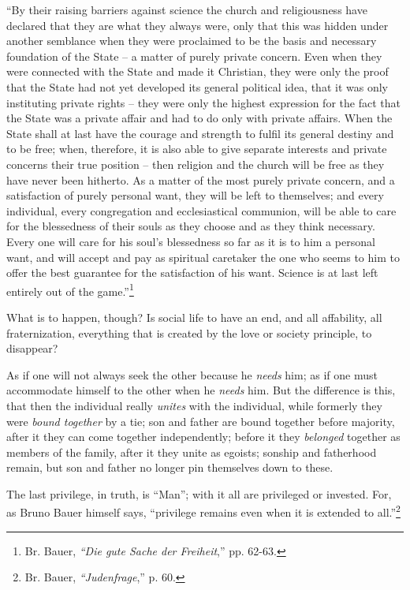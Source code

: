 ``By their raising barriers against science the church and religiousness have 
declared that they are what they always were, only that this was hidden under 
another semblance when they were proclaimed to be the basis and necessary 
foundation of the State -- a matter of purely private concern. Even when they 
were connected with the State and made it Christian, they were only the proof 
that the State had not yet developed its general political idea, that it was 
only instituting private rights -- they were only the highest expression for 
the fact that the State was a private affair and had to do only with private 
affairs. When the State shall at last have the courage and strength to fulfil 
its general destiny and to be free; when, therefore, it is also able to give 
separate interests and private concerns their true position -- then religion 
and the church will be free as they have never been hitherto. As a matter of 
the most purely private concern, and a satisfaction of purely personal want, 
they will be left to themselves; and every individual, every congregation and 
ecclesiastical communion, will be able to care for the blessedness of their 
souls as they choose and as they think necessary. Every one will care for his 
soul's blessedness so far as it is to him a personal want, and will accept and 
pay as spiritual caretaker the one who seems to him to offer the best 
guarantee for the satisfaction of his want. Science is at last left entirely 
out of the game.''\footnote{Br. Bauer, \textit{``Die gute Sache der 
Freiheit},'' pp. 62-63.}

What is to happen, though? Is social life to have an end, and all affability, 
all fraternization, everything that is created by the love or society 
principle, to disappear?

As if one will not always seek the other because he \textit{needs} him; as if 
one must accommodate himself to the other when he \textit{needs} him. But the 
difference is this, that then the individual really \textit{unites} with the 
individual, while formerly they were \textit{bound together} by a tie; son and 
father are bound together before majority, after it they can come together 
independently; before it they \textit{belonged} together as members of the 
family, after it they unite as egoists; sonship and fatherhood remain, but son 
and father no longer pin themselves down to these.

The last privilege, in truth, is ``Man''; with it all are privileged or 
invested. For, as Bruno Bauer himself says, ``privilege remains even when it 
is extended to all.''\footnote{Br. Bauer, \textit{``Judenfrage},'' p. 60.}

